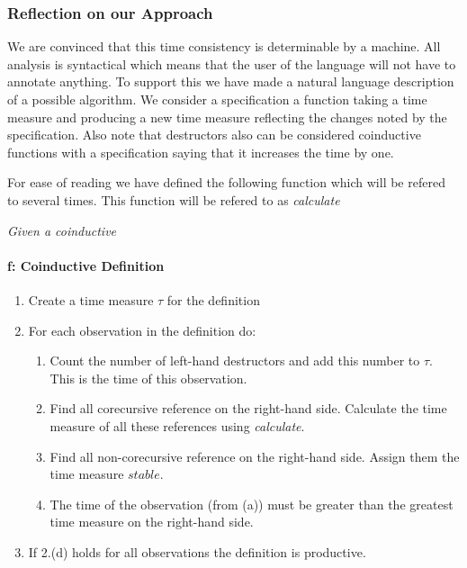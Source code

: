 \subsubsection{Reflection on our Approach}
We are convinced that this time consistency is determinable by a machine. All analysis is syntactical which means that the user of the language will not have to annotate anything. To support this we have made a natural language description of a possible algorithm. We consider a specification a function taking a time measure and producing a new time measure reflecting the changes noted by the specification. Also note that destructors also can be considered coinductive functions with a specification saying that it increases the time by one.

For ease of reading we have defined the following function which will be refered to several times. This function will be refered to as \textit{calculate}

\begin{centerline}
\textit{Given a coinductive 	}
\end{centerline}

\paragraph{f: Coinductive Definition}
\begin{enumerate}
\item Create a time measure $\tau$ for the definition
\item For each observation in the definition do:
\begin{enumerate}
\item Count the number of left-hand destructors and add this number to $\tau$. This is the time of this observation. 
\item Find all corecursive reference on the right-hand side. Calculate the time measure of all these references using \textit{calculate}.
\item Find all non-corecursive reference on the right-hand side. Assign them the time measure $stable$.
\item The time of the observation (from (a)) must be greater than the greatest time measure on the right-hand side.
\end{enumerate}
\item If 2.(d) holds for all observations the definition is productive.
\end{enumerate}

